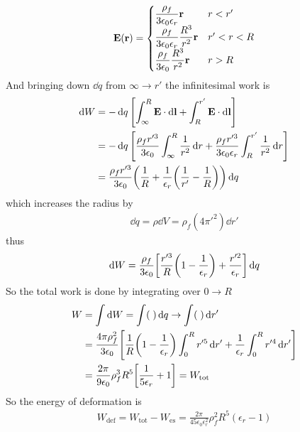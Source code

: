 \documentclass[../main.tex]{subfiles}
\begin{document}
\begin{align*}
    \vb E(\vb r) = \begin{cases}
        \dfrac{\rho_f}{3\epsilon_0 \epsilon_r} \vb r & r < r' \\
        \dfrac{\rho_f}{3\epsilon_0 \epsilon_r} \dfrac{R^3}{r^2} \vb r & r' < r < R \\
        \dfrac{\rho_f}{3\epsilon_0} \dfrac{R^3}{r^2} \vb r & r > R
    \end{cases}
\end{align*}
And bringing down $\dd{q}$ from $\infty \to r'$ the infinitesimal work is
\begin{align*}
    \dd{W} &= -\dd{q} \qt[\int_\infty^R \vb E \cdot \dd{\vb l} + \int_R^{r'} \vb E \cdot \dd{\vb l}] \\
    &= -\dd{q} \qt[
        \frac{\rho_f r'^3}{3 \epsilon_0} \int_\infty^R \frac{1}{r^2} \dd{r} 
        + \frac{\rho_f r'^3}{3 \epsilon_0 \epsilon_r} \int_R^{r'} \frac{1}{r^2} \dd{r}
    ] \\
    &= \frac{\rho_f r'^3}{3\epsilon_0} \qt(
        \frac{1}{R} + \frac{1}{\epsilon_r} \qt(\frac{1}{r'} - \frac{1}{R})
    ) \dd{q} 
\end{align*}
which increases the radius by
\begin{align*}
    \dd{q} = \rho \dd{V} = \rho_f (4\pi'^2) \dd{r'}
\end{align*}
thus
\begin{align*}
    \dd{W} = \frac{\rho_f}{3\epsilon_0} \qt[
        \frac{r'^3}{R} \qt(1 - \frac{1}{\epsilon_r}) + \frac{r'^2}{\epsilon_r} 
    ] \dd{q}
\end{align*}
So the total work is done by integrating over $0 \to R$
\begin{align*}
    W &= \int \dd{W} = \int (\;) \dd{q} \to \int (\;) \dd{r'} \\
    &= \frac{4\pi \rho_f^2}{3\epsilon_0} \qt[
        \frac{1}{R} \qt(1 - \frac{1}{\epsilon_r}) \int_0^R r'^5 \dd{r'} + \frac{1}{\epsilon_r} \int_0^R r'^4 \dd{r'}
    ] \\
    &= \frac{2\pi}{9 \epsilon_0} \rho_f^3 R^5 \qt[
        \frac{1}{5\epsilon_r} + 1
    ] = W_\text{tot}
\end{align*}
So the energy of deformation is
\begin{align*}
    W_\text{def} = W_\text{tot} - W_\text{es} = \frac{2\pi}{45\epsilon_0 \epsilon_r^2} \rho_f^2 R^5 (\epsilon_r - 1)
\end{align*}
\end{document}
